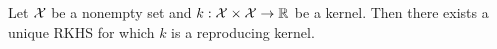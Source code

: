 Let \(\mathcal{X}\) be a nonempty set and \(k : \mathcal{X} \times \mathcal{X} \to \mathbb{R}\) be a kernel.
Then there exists a unique RKHS for which \(k\) is a reproducing kernel.